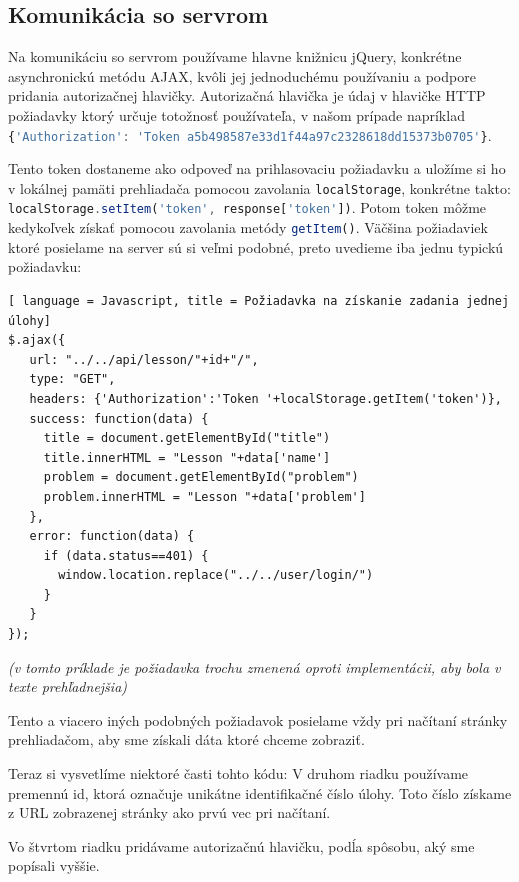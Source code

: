 \subsection{Komunikácia so servrom}
Na komunikáciu so servrom používame hlavne knižnicu jQuery, konkrétne asynchronickú metódu AJAX, kvôli jej jednoduchému
používaniu a podpore pridania autorizačnej hlavičky. Autorizačná hlavička
je údaj v hlavičke HTTP požiadavky ktorý určuje totožnosť používateľa, v našom prípade napríklad
\lstinline[language=Javascript]|{'Authorization': 'Token a5b498587e33d1f44a97c2328618dd15373b0705'}|.

Tento token dostaneme ako odpoveď na prihlasovaciu požiadavku a uložíme si ho
v lokálnej pamäti prehliadača pomocou zavolania
\lstinline[language=Javascript]|localStorage|, konkrétne takto:\newline
\lstinline[language=Javascript]|localStorage.setItem('token', response['token'])|.
Potom token môžme kedykoľvek získať pomocou zavolania metódy
\lstinline[language=Javascript]|getItem()|.
Väčšina požiadaviek ktoré posielame na server sú si veľmi podobné, preto uvedieme
iba jednu typickú požiadavku:

\begin{lstlisting}[ language = Javascript, title = Požiadavka na získanie zadania jednej úlohy]
$.ajax({
   url: "../../api/lesson/"+id+"/",
   type: "GET",
   headers: {'Authorization':'Token '+localStorage.getItem('token')},
   success: function(data) {
     title = document.getElementById("title")
     title.innerHTML = "Lesson "+data['name']
     problem = document.getElementById("problem")
     problem.innerHTML = "Lesson "+data['problem']
   },
   error: function(data) {
     if (data.status==401) {
       window.location.replace("../../user/login/")
     }
   }
});
\end{lstlisting}
\textit{(v tomto príklade je požiadavka trochu zmenená oproti implementácii, aby bola v texte
prehľadnejšia)}
\newline

Tento a viacero iných podobných požiadavok posielame vždy pri načítaní stránky
prehliadačom, aby sme získali dáta ktoré chceme zobraziť.

Teraz si vysvetlíme niektoré časti tohto kódu:\newline
V druhom riadku používame premennú id, ktorá označuje unikátne identifikačné číslo
úlohy. Toto číslo získame z URL zobrazenej stránky ako prvú vec pri načítaní.

Vo štvrtom riadku pridávame autorizačnú hlavičku, podĺa spôsobu, aký sme popísali vyššie.


